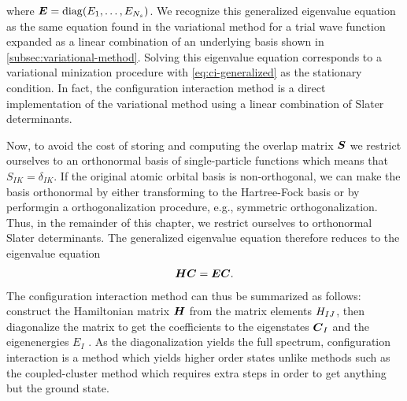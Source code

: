         where $\boldsymbol{E} = \operatorname{diag}(E_1, \dots, E_{N_s})$.
        We recognize this generalized eigenvalue equation as the same equation
        found in the variational method for a trial wave function expanded as a
        linear combination of an underlying basis shown in
        \autoref{subsec:variational-method}.
        Solving this eigenvalue equation corresponds to a variational minization
        procedure with \autoref{eq:ci-generalized} as the stationary condition.
        In fact, the configuration interaction method is a direct implementation
        of the variational method using a linear combination of Slater
        determinants.

        Now, to avoid the cost of storing and computing the overlap matrix
        $\boldsymbol{S}$ we restrict ourselves to an orthonormal basis of
        single-particle functions which means that $S_{IK} = \delta_{IK}$.
        If the original atomic orbital basis is non-orthogonal, we can make the
        basis orthonormal by either transforming to the Hartree-Fock basis or by
        performgin a orthogonalization procedure, e.g., symmetric
        orthogonalization.
        Thus, in the remainder of this chapter, we restrict ourselves to
        orthonormal Slater determinants.
        The generalized eigenvalue equation therefore reduces to the eigenvalue
        equation
        \begin{align}
            \boldsymbol{H}\boldsymbol{C} = \boldsymbol{E}\boldsymbol{C}.
        \end{align}
        The configuration interaction method can thus be summarized as follows:
        construct the Hamiltonian matrix $\boldsymbol{H}$ from the matrix elements
        $H_{IJ}$, then diagonalize the matrix to get the coefficients to
        the eigenstates $\boldsymbol{C}_I$ and the eigenenergies $E_I$
        \cite{karwowski}.
        As the diagonalization yields the full spectrum, configuration
        interaction is a method which yields higher order states unlike methods
        such as the coupled-cluster method which requires extra steps in order
        to get anything but the ground state.

